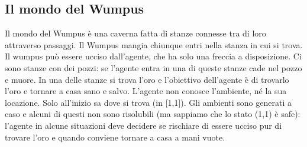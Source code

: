\documentclass{article}
\begin{document}
\subsection{Il mondo del Wumpus}
Il mondo del Wumpus è una caverna fatta di stanze connesse tra di loro attraverso passaggi. Il Wumpus mangia chiunque entri nella stanza in cui si trova. Il wumpus può essere ucciso dall’agente, che ha solo una freccia a disposizione. Ci sono stanze con dei pozzi: se l’agente entra in una di queste stanze cade nel pozzo e muore. In una delle stanze si trova l’oro e l’obiettivo dell’agente è di trovarlo l’oro e tornare a casa sano e salvo. L’agente non conosce l’ambiente, né la sua locazione. Solo all’inizio sa dove si trova (in [1,1]).
Gli ambienti sono generati a caso e alcuni di questi non sono risolubili (ma sappiamo che lo stato (1,1) è safe): l’agente in alcune situazioni deve decidere se rischiare di essere ucciso pur di trovare l’oro e quando conviene tornare a casa a mani vuote.
\end{document}
